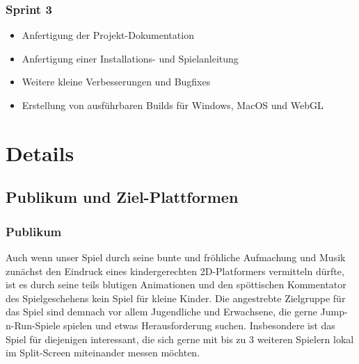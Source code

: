 \subsubsection*{Sprint 3}

\begin{itemize}
    \item Anfertigung der Projekt-Dokumentation
    \item Anfertigung einer Installations- und Spielanleitung
    \item Weitere kleine Verbesserungen und Bugfixes
    \item Erstellung von ausführbaren Builds für Windows, MacOS und WebGL
\end{itemize}


\section{Details}

\subsection{Publikum und Ziel-Plattformen}

\subsubsection*{Publikum}
Auch wenn unser Spiel durch seine bunte und fröhliche Aufmachung und Musik zunächst den Eindruck eines kindergerechten 2D-Platformers vermitteln dürfte, ist es durch seine teils blutigen Animationen und den spöttischen Kommentator des Spielgeschehens kein Spiel für kleine Kinder. Die angestrebte Zielgruppe für das Spiel sind demnach vor allem Jugendliche und Erwachsene, die gerne Jump-n-Run-Spiele spielen und etwas Herausforderung suchen. Insbesondere ist das Spiel für diejenigen interessant, die sich gerne mit bis zu 3 weiteren Spielern lokal im Split-Screen miteinander messen möchten.


